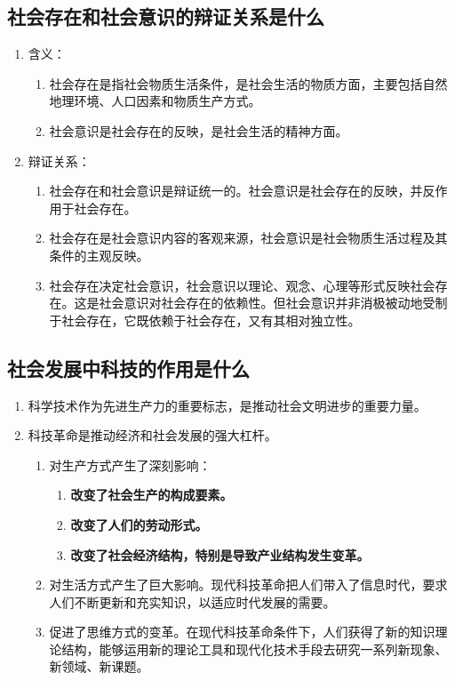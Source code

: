 \documentclass[12pt, a4paper, oneside]{ctexbook}
\begin{document}
\subsection{社会存在和社会意识的辩证关系是什么}

\begin{enumerate}
\item 含义：
\begin{enumerate}
\item 社会存在是指社会物质生活条件，是社会生活的物质方面，主要包括自然地理环境、人口因素和物质生产方式。
\item 社会意识是社会存在的反映，是社会生活的精神方面。
\end{enumerate}
\item 辩证关系：
\begin{enumerate}
\item 社会存在和社会意识是辩证统一的。社会意识是社会存在的反映，并反作用于社会存在。
\item 社会存在是社会意识内容的客观来源，社会意识是社会物质生活过程及其条件的主观反映。
\item 社会存在决定社会意识，社会意识以理论、观念、心理等形式反映社会存在。这是社会意识对社会存在的依赖性。但社会意识并非消极被动地受制于社会存在，它既依赖于社会存在，又有其相对独立性。
\end{enumerate}
\end{enumerate}

\subsection{社会发展中科技的作用是什么}

\begin{enumerate}
\item 科学技术作为先进生产力的重要标志，是推动社会文明进步的重要力量。
\item 科技革命是推动经济和社会发展的强大杠杆。
\begin{enumerate}
\item 对生产方式产生了深刻影响：
\begin{enumerate}
\item \textbf{改变了社会生产的构成要素。}
\item \textbf{改变了人们的劳动形式。}
\item \textbf{改变了社会经济结构，特别是导致产业结构发生变革。}
\end{enumerate}
\item 对生活方式产生了巨大影响。现代科技革命把人们带入了信息时代，要求人们不断更新和充实知识，以适应时代发展的需要。
\item 促进了思维方式的变革。在现代科技革命条件下，人们获得了新的知识理论结构，能够运用新的理论工具和现代化技术手段去研究一系列新现象、新领域、新课题。
\end{enumerate}
\end{enumerate}
\end{document}
